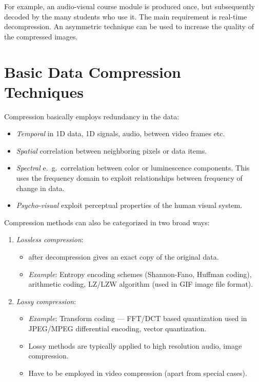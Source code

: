 For example, an audio-visual course module is produced once, but subsequently decoded by the many students who use it. The main requirement is real-time decompression. An asymmetric technique can be used to increase the quality of the compressed images.

\section{Basic Data Compression Techniques}
Compression basically employs redundancy in the data:
\begin{itemize}
	\item \textit{Temporal} in 1D data, 1D signals, audio, between video frames etc.
	\item \textit{Spatial} correlation between neighboring pixels or data items.
	\item \textit{Spectral} e.\ g.\ correlation between color or luminescence components. This uses the frequency domain to exploit relationships between frequency of change in data.
	\item \textit{Psycho-visual} exploit perceptual properties of the human visual system.
\end{itemize}

Compression methods can also be categorized in two broad ways:
\begin{enumerate}
	\item \textit{Lossless compression}:
	\begin{itemize}
		\item after decompression gives an exact copy of the original data.
		\item \textit{Example}: Entropy encoding schemes (Shannon-Fano, Huffman coding),	arithmetic coding, LZ/LZW algorithm (used in GIF image file format).
	\end{itemize}
	\item \textit{Lossy compression}:
		\begin{itemize}
		\item \textit{Example}: Transform coding — FFT/DCT based quantization used in	JPEG/MPEG differential encoding, vector quantization.
		\item Lossy methods are typically applied to high resolution audio, image compression.
		\item Have to be employed in video compression (apart from special cases).
	\end{itemize}
\end{enumerate}
 

